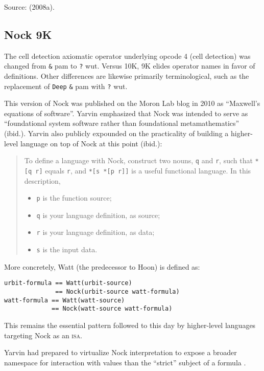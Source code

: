 \documentclass[twoside]{article}
\begin{document}
Source:   (2008a). %

\subsection{Nock 9K}

The cell detection axiomatic operator underlying opcode 4 (cell detection) was changed from \texttt{\&} pam to \texttt{?} wut.  Versus 10K, 9K elides operator names in favor of definitions.  Other differences are likewise primarily terminological, such as the replacement of \texttt{Deep} \texttt{\&} pam with \texttt{?} wut.

This version of Nock was published on the Moron Lab blog in 2010 \citep{Yarvin2010c} as ``Maxwell's equations of software''.  Yarvin emphasized that Nock was intended to serve as ``foundational system software rather than foundational metamathematics'' (ibid.).  Yarvin also publicly expounded on the practicality of building a higher-level language on top of Nock at this point (ibid.):

\begin{quote}
To define a language with Nock, construct two nouns, \texttt{q} and \texttt{r}, such that \texttt{*[q r]} equals \texttt{r}, and \texttt{*[s *[p r]]} is a useful functional language. In this description,
\begin{itemize}
  \item  \texttt{p} is the function source;
  \item  \texttt{q} is your language definition, as source;
  \item  \texttt{r} is your language definition, as data;
  \item  \texttt{s} is the input data.
\end{itemize}
\end{quote}

\noindent
More concretely, Watt (the predecessor to Hoon) is defined as:

\begin{lstlisting}[style=listingcode]
urbit-formula == Watt(urbit-source)
              == Nock(urbit-source watt-formula)
watt-formula == Watt(watt-source)
             == Nock(watt-source watt-formula)
\end{lstlisting}

\noindent
This remains the essential pattern followed to this day by higher-level languages targeting Nock as an \textsc{isa}.

Yarvin had prepared to virtualize Nock interpretation to expose a broader namespace for interaction with values than the ``strict'' subject of a formula \citep{Yarvin2010c}.
\end{document}
